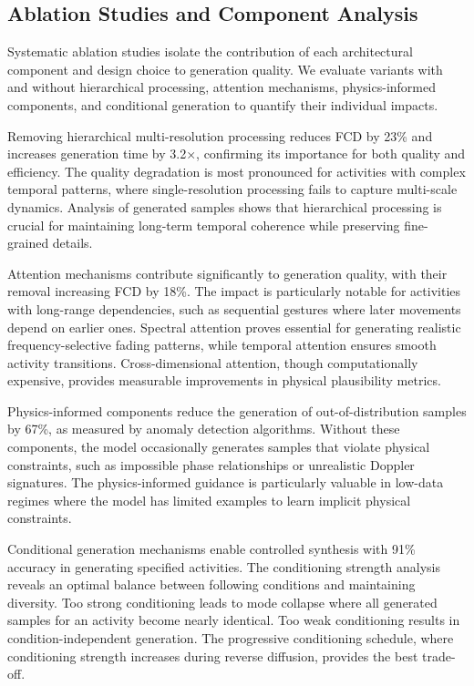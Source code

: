 \documentclass[journal]{IEEEtran}
\begin{document}
\subsection{Ablation Studies and Component Analysis}

Systematic ablation studies isolate the contribution of each architectural component and design choice to generation quality. We evaluate variants with and without hierarchical processing, attention mechanisms, physics-informed components, and conditional generation to quantify their individual impacts.

Removing hierarchical multi-resolution processing reduces FCD by 23\% and increases generation time by 3.2×, confirming its importance for both quality and efficiency. The quality degradation is most pronounced for activities with complex temporal patterns, where single-resolution processing fails to capture multi-scale dynamics. Analysis of generated samples shows that hierarchical processing is crucial for maintaining long-term temporal coherence while preserving fine-grained details.

Attention mechanisms contribute significantly to generation quality, with their removal increasing FCD by 18\%. The impact is particularly notable for activities with long-range dependencies, such as sequential gestures where later movements depend on earlier ones. Spectral attention proves essential for generating realistic frequency-selective fading patterns, while temporal attention ensures smooth activity transitions. Cross-dimensional attention, though computationally expensive, provides measurable improvements in physical plausibility metrics.

Physics-informed components reduce the generation of out-of-distribution samples by 67\%, as measured by anomaly detection algorithms. Without these components, the model occasionally generates samples that violate physical constraints, such as impossible phase relationships or unrealistic Doppler signatures. The physics-informed guidance is particularly valuable in low-data regimes where the model has limited examples to learn implicit physical constraints.

Conditional generation mechanisms enable controlled synthesis with 91\% accuracy in generating specified activities. The conditioning strength analysis reveals an optimal balance between following conditions and maintaining diversity. Too strong conditioning leads to mode collapse where all generated samples for an activity become nearly identical. Too weak conditioning results in condition-independent generation. The progressive conditioning schedule, where conditioning strength increases during reverse diffusion, provides the best trade-off.
\end{document}
